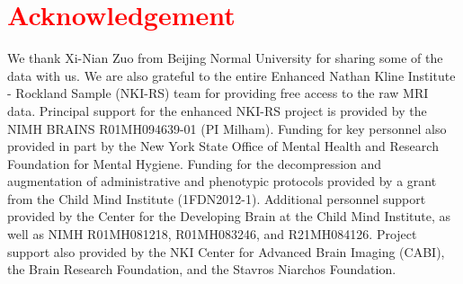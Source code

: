 \documentclass[runningheads]{llncs}
\begin{document}
\section{\textcolor{red}{Acknowledgement}}
We thank Xi-Nian Zuo from Beijing Normal University for sharing some of the data with us. We are also grateful to the entire Enhanced Nathan Kline Institute - Rockland Sample (NKI-RS) team for providing free access to the raw MRI data. Principal support for the enhanced NKI-RS project is provided by the NIMH BRAINS R01MH094639-01 (PI Milham). Funding for key personnel also provided in part by the New York State Office of Mental Health and Research Foundation for Mental Hygiene. Funding for the decompression and augmentation of administrative and phenotypic protocols provided by a grant from the Child Mind Institute (1FDN2012-1). Additional personnel support provided by the Center for the Developing Brain at the Child Mind Institute, as well as NIMH R01MH081218, R01MH083246, and R21MH084126. Project support also provided by the NKI Center for Advanced Brain Imaging (CABI), the Brain Research Foundation, and the Stavros Niarchos Foundation.





\appendix

\end{document}
